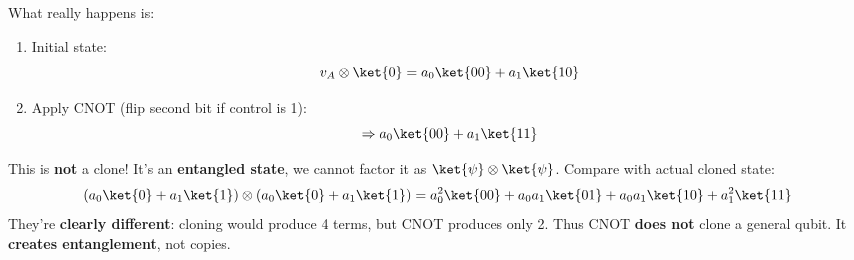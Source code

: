 \newpage

\noindent
What really happens is:
\begin{enumerate}
    \item Initial state:
    \begin{equation*}
        v_{A} \otimes \ket{0} = a_{0}\ket{00} + a_{1}\ket{10}
    \end{equation*}
    \item Apply CNOT (flip second bit if control is 1):
    \begin{equation*}
        \Rightarrow a_{0}\ket{00} + a_{1}\ket{11}
    \end{equation*}
\end{enumerate}
This is \textbf{not} a clone! It's an \textbf{entangled state}, we cannot factor it as $\ket{\psi} \otimes \ket{\psi}$. Compare with actual cloned state:
\begin{equation*}
    \left(a_{0}\ket{0} + a_{1}\ket{1}\right) \otimes \left(a_{0}\ket{0} + a_{1}\ket{1}\right)
    =
    a_{0}^{2}\ket{00} + a_{0}a_{1}\ket{01} + a_{0}a_{1}\ket{10} + a_{1}^{2}\ket{11}
\end{equation*}
They're \textbf{clearly different}: cloning would produce 4 terms, but CNOT produces only 2. Thus CNOT \textbf{does not} clone a general qubit. It \textbf{creates entanglement}, not copies.